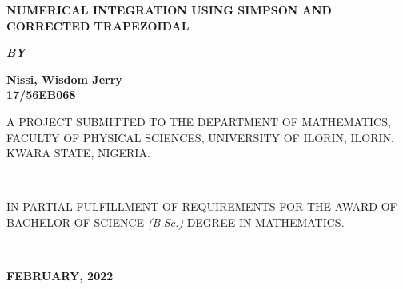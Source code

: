 \documentclass[12pt]{report}
\newcommand{\bt}[1]{\textbf{#1}}
\begin{document}
	
	\clearpage
	\thispagestyle{empty}
	\begin{center}
		\LARGE \bt{NUMERICAL INTEGRATION USING SIMPSON AND CORRECTED TRAPEZOIDAL}
	\end{center}

	\hspace{5cm}
	
	\begin{center}
		\textbf{\textit{BY}}
	\end{center}
	
	\hspace{4cm}
	
	\begin{center}
		\Large \textbf{Nissi, Wisdom Jerry
			\\
			17/56EB068}
	\end{center}
	
	\hspace{6cm}
	
	\begin{center}
		A PROJECT SUBMITTED TO THE DEPARTMENT OF MATHEMATICS, FACULTY OF PHYSICAL SCIENCES, UNIVERSITY OF ILORIN, ILORIN, KWARA STATE, NIGERIA.
	\end{center}

	\hspace{4cm} \\
	
	\begin{center}
		IN PARTIAL FULFILLMENT OF REQUIREMENTS FOR THE AWARD OF BACHELOR OF SCIENCE \textit{(B.Sc.)} DEGREE IN MATHEMATICS.
	\end{center}
	\hspace{4.5cm}
	\\ 
	\begin{center}
		\textbf{FEBRUARY, 2022}
	\end{center}

	\newpage
\end{document}
